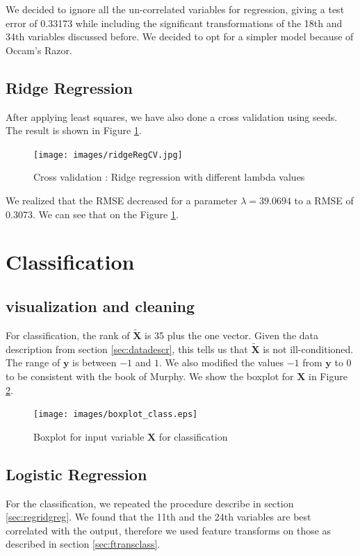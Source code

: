 \documentclass{article} %
\begin{document}
We decided to ignore all the un-correlated variables for regression, giving a test error of 0.33173 while including the significant transformations of the 18th and 34th variables discussed before. We decided to opt for a simpler model because of Occam’s Razor.


\subsection{Ridge Regression}
After applying least squares, we have also done a cross validation using seeds. The result is shown in Figure \ref{fig:ridreggcv}.
\begin{figure}
\centering
\texttt{[image: images/ridgeRegCV.jpg]}
\caption{Cross validation : Ridge regression with different lambda values }
\label{fig:ridreggcv}
\end{figure}
We realized that the RMSE decreased for a parameter $\lambda = 39.0694$ to a RMSE of $0.3073$. We can see that on the Figure \ref{fig:ridreggcv}.
\section{Classification}
\subsection{visualization and cleaning}

For classification, the rank of $\mathbf{\tilde{X}}$ is 35 plus the one vector. Given the data description from section \ref{sec:datadescr}, this tells us that $\mathbf{\tilde{X}}$ is not ill-conditioned.\\ The range of $\mathbf{y}$ is between $-1$ and $1$. We also modified the values $-1$ from $\mathbf{y}$ to 0 to be consistent with the book of Murphy. We show the boxplot for $\mathbf{X}$ in Figure \ref{fig:boxplotclass}.
\begin{figure}
\centering
\texttt{[image: images/boxplot\_class.eps]}
\caption{Boxplot for input variable $\mathbf{X}$ for classification}
\label{fig:boxplotclass}
\end{figure}
\subsection{Logistic Regression}
For the classification, we repeated the procedure describe in section \ref{sec:regridgreg}. We found that the 11th and the 24th variables are best correlated with the output, therefore we used feature transforms on those as described in section \ref{sec:ftransclass}.
\end{document}
